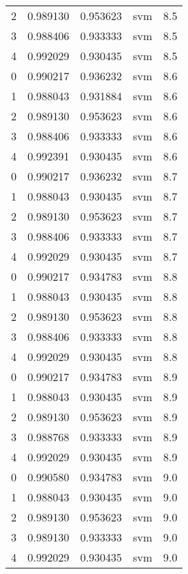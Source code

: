 \begin{tabular}{rrrlr}
     2 & 0.989130 & 0.953623 &      svm &        8.5 \\
     3 & 0.988406 & 0.933333 &      svm &        8.5 \\
     4 & 0.992029 & 0.930435 &      svm &        8.5 \\
     0 & 0.990217 & 0.936232 &      svm &        8.6 \\
     1 & 0.988043 & 0.931884 &      svm &        8.6 \\
     2 & 0.989130 & 0.953623 &      svm &        8.6 \\
     3 & 0.988406 & 0.933333 &      svm &        8.6 \\
     4 & 0.992391 & 0.930435 &      svm &        8.6 \\
     0 & 0.990217 & 0.936232 &      svm &        8.7 \\
     1 & 0.988043 & 0.930435 &      svm &        8.7 \\
     2 & 0.989130 & 0.953623 &      svm &        8.7 \\
     3 & 0.988406 & 0.933333 &      svm &        8.7 \\
     4 & 0.992029 & 0.930435 &      svm &        8.7 \\
     0 & 0.990217 & 0.934783 &      svm &        8.8 \\
     1 & 0.988043 & 0.930435 &      svm &        8.8 \\
     2 & 0.989130 & 0.953623 &      svm &        8.8 \\
     3 & 0.988406 & 0.933333 &      svm &        8.8 \\
     4 & 0.992029 & 0.930435 &      svm &        8.8 \\
     0 & 0.990217 & 0.934783 &      svm &        8.9 \\
     1 & 0.988043 & 0.930435 &      svm &        8.9 \\
     2 & 0.989130 & 0.953623 &      svm &        8.9 \\
     3 & 0.988768 & 0.933333 &      svm &        8.9 \\
     4 & 0.992029 & 0.930435 &      svm &        8.9 \\
     0 & 0.990580 & 0.934783 &      svm &        9.0 \\
     1 & 0.988043 & 0.930435 &      svm &        9.0 \\
     2 & 0.989130 & 0.953623 &      svm &        9.0 \\
     3 & 0.989130 & 0.933333 &      svm &        9.0 \\
     4 & 0.992029 & 0.930435 &      svm &        9.0 \\

\end{tabular}
